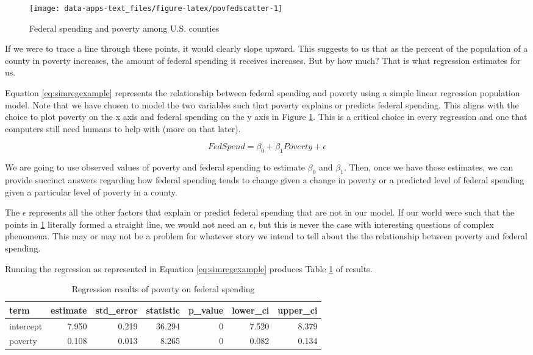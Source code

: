 \documentclass[
]{book}
\begin{document}
\begin{figure}

{\centering \texttt{[image: data-apps-text\_files/figure-latex/povfedscatter-1]} 

}

\caption{Federal spending and poverty among U.S. counties}\label{fig:povfedscatter}
\end{figure}

If we were to trace a line through these points, it would clearly slope upward. This suggests to us that as the percent of the population of a county in poverty increases, the amount of federal spending it receives increases. But by how much? That is what regression estimates for us.

Equation \eqref{eq:simregexample} represents the relationship between federal spending and poverty using a simple linear regression population model. Note that we have chosen to model the two variables such that poverty explains or predicts federal spending. This aligns with the choice to plot poverty on the x axis and federal spending on the y axis in Figure \ref{fig:povfedscatter}. This is a critical choice in every regression and one that computers still need humans to help with (more on that later).

\begin{equation}
FedSpend = \beta_0+\beta_1Poverty + \epsilon
\label{eq:simregexample}
\end{equation}

We are going to use observed values of poverty and federal spending to estimate \(\beta_0\) and \(\beta_1\). Then, once we have those estimates, we can provide succinct answers regarding how federal spending tends to change given a change in poverty or a predicted level of federal spending given a particular level of poverty in a county.

The \(\epsilon\) represents all the other factors that explain or predict federal spending that are not in our model. If our world were such that the points in \ref{fig:povfedscatter} literally formed a straight line, we would not need an \(\epsilon\), but this is never the case with interesting questions of complex phenomena. This may or may not be a problem for whatever story we intend to tell about the the relationship between poverty and federal spending.

Running the regression as represented in Equation \eqref{eq:simregexample} produces Table \ref{tab:simpregextab} of results.

\begin{table}

\caption{\label{tab:simpregextab}Regression results of poverty on federal spending}
\centering
\begin{tabular}[t]{l|r|r|r|r|r|r}
\hline
term & estimate & std\_error & statistic & p\_value & lower\_ci & upper\_ci\\
\hline
intercept & 7.950 & 0.219 & 36.294 & 0 & 7.520 & 8.379\\
\hline
poverty & 0.108 & 0.013 & 8.265 & 0 & 0.082 & 0.134\\
\hline
\end{tabular}
\end{table}
\end{document}
